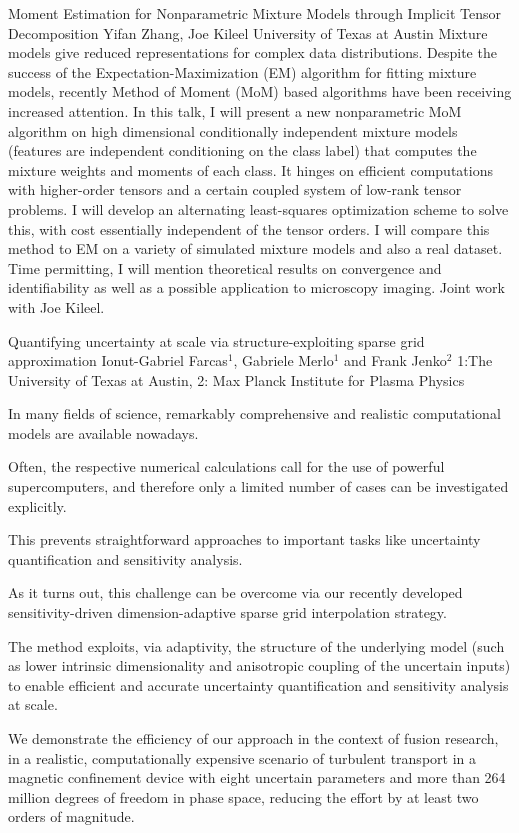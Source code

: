 \begin{addmargin}[2em]{0em}
\vspace{1.5ex}
\abs
{Moment Estimation for Nonparametric Mixture Models through Implicit Tensor Decomposition}
{Yifan Zhang, Joe Kileel}
{University of Texas at Austin}
{Mixture models give reduced representations for complex data distributions. Despite the success of the Expectation-Maximization (EM) algorithm for fitting mixture models, recently Method of Moment (MoM) based algorithms have been receiving increased attention. In this talk, I will present a new nonparametric MoM algorithm on high dimensional conditionally independent mixture models (features are independent conditioning on the class label) that computes the mixture weights and moments of each class. It hinges on efficient computations with higher-order tensors and a certain coupled system of low-rank tensor problems. I will develop an alternating least-squares optimization scheme to solve this, with cost essentially independent of the tensor orders. I will compare this method to EM on a variety of simulated mixture models and also a real dataset. Time permitting, I will mention theoretical results on convergence and identifiability as well as a possible application to microscopy imaging. Joint work with Joe Kileel.}


\vspace{1.5ex}
\abs
{Quantifying uncertainty at scale via structure-exploiting sparse grid approximation}
{Ionut-Gabriel Farcas$^{1}$, Gabriele Merlo$^{1}$ and Frank Jenko$^{2}$}
{1:The University of Texas at Austin, 2: Max Planck Institute for Plasma Physics}
{In many fields of science, remarkably comprehensive and realistic computational models are available nowadays.

Often, the respective numerical calculations call for the use of powerful supercomputers, and therefore only a limited number of cases can be investigated explicitly.

This prevents straightforward approaches to important tasks like uncertainty quantification and sensitivity analysis.

As it turns out, this challenge can be overcome via our recently developed sensitivity-driven dimension-adaptive sparse grid interpolation strategy.

The method exploits, via adaptivity, the structure of the underlying model (such as lower intrinsic dimensionality and anisotropic coupling of the uncertain inputs) to enable efficient and accurate uncertainty quantification and sensitivity analysis at scale.

We demonstrate the efficiency of our approach in the context of fusion research, in a realistic, computationally expensive scenario of turbulent transport in a magnetic confinement device with eight uncertain parameters and more than 264 million degrees of freedom in phase space, reducing the effort by at least two orders of magnitude.

}
\end{addmargin}
